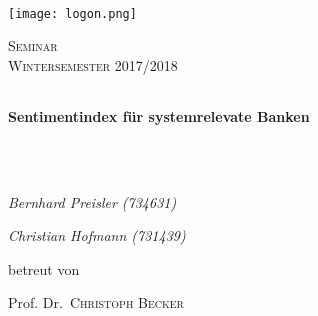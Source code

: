 

\setlength{\parindent}{0pt}

\renewcommand{\footrulewidth}{0.8pt}

\begin{titlepage}
	\text{}\vspace{-0.15cm}\\
	\begin{center}\hspace{-1.15cm} 
		\texttt{[image: logon.png]} 
	\end{center}
	
	\vspace{1.0cm}
	
	\vspace{0.25cm}
	
	\begin{center}\Large{\textsc{Seminar \\Wintersemester 2017/2018}}
	\end{center}\vspace{1.5cm}
	
	\begin{tabularx}
		{\textwidth}{l}
		\hline
	\end{tabularx}
	
	\begin{center}
		\LARGE{\textbf{Sentimentindex für systemrelevate Banken}}
	\end{center}
	
	\begin{tabularx}
		{\textwidth}{l}
		\hline
	\end{tabularx}\vspace{1.4cm}\\
	
	
	\begin{center}
		{\Large\itshape Bernhard Preisler (734631)\par}
		{\Large\itshape Christian Hofmann (731439)\par}
	\end{center}
	\vfill
	betreut von\par
	Prof. Dr.~\textsc{Christoph Becker}
	

\end{titlepage}
